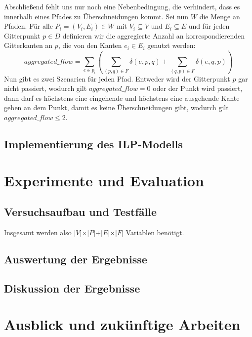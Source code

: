 \documentclass[bachelor, german]{algothesis}
\begin{document}
Abschließend fehlt uns nur noch eine Nebenbedingung, die verhindert, dass es innerhalb eines Pfades zu Überschneidungen kommt. Sei nun $W$ die Menge an Pfaden. Für alle $P_i =(V_i, E_i) \in W$  mit $V_i\subseteq V$ und  $E_i \subseteq E$ und für jeden Gitterpunkt $p \in D$ definieren wir die aggregierte Anzahl an korrespondierenden Gitterkanten an $p$, die von den Kanten $e_i \in E_i$ genutzt werden: $$aggregated\_flow = \sum_{e \in p_i}(\sum_{(p,q) \in F} \delta(e,p,q) + \sum_{(q,p) \in F} \delta(e,q,p))$$  Nun gibt es zwei Szenarien für jeden Pfad. Entweder wird der Gitterpunkt $p$ gar nicht passiert, wodurch gilt $aggregated\_flow = 0$ oder der Punkt wird passiert, dann darf es höchstens eine eingehende und höchstens eine ausgehende Kante geben an dem Punkt, damit es keine Überschneidungen gibt, wodurch gilt $aggregated\_flow \leq 2$.\newline 


\section{Implementierung des ILP-Modells}


\chapter{Experimente und Evaluation}
\section{Versuchsaufbau und Testfälle}
Insgesamt werden also $\vert V\vert \times \vert P\vert + \vert E \vert \times \vert F\vert$ Variablen benötigt. 
\section{Auswertung der Ergebnisse}
\section{Diskussion der Ergebnisse}

\chapter{Ausblick und zukünftige Arbeiten}
\cite{GraohTh}\cite{Handbook} \cite{DrawingAlgo} \cite{DrawingMeth}
\clearpage


\end{document}

